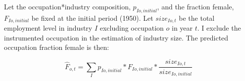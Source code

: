 \documentclass[12pt]{article}
\begin{document}

Let the occupation*industry composition, $p_{Io,initial}$, and the fraction female, $ F_{Io,initial}$ be fixed at the initial period (1950). Let $size_{Io,t}$ be the total employment level in industry $I$ excluding occupation $o$ in year $t$. I exclude the instrumented occupation in the estimation of industry size. The predicted occupation fraction female is then:

$$\hat{F}_{o,t} = \sum_I p_{Io,initial}*F_{Io,initial}*\frac{size_{Io,t}}{size_{Io,initial}}$$




\end{document}

